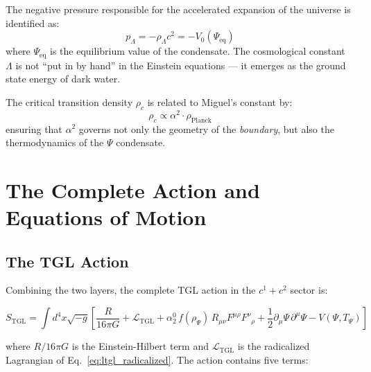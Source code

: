 \documentclass[12pt,a4paper,twoside]{article}
\newcommand{\alphaii}{\alpha^{2}}
\newcommand{\Ltgl}{\mathcal{L}_{\text{TGL}}}
\newcommand{\Psifield}{\Psi}
\newcommand{\boundary}{\textit{boundary}}
\begin{document}
The negative pressure responsible for the accelerated expansion of the universe is identified as:
\begin{equation}
p_\Lambda = -\rho_\Lambda c^2 = -V_0(\Psifield_{\text{eq}})
\label{eq:dark_pressure}
\end{equation}
where $\Psifield_{\text{eq}}$ is the equilibrium value of the condensate. The cosmological constant $\Lambda$ is not ``put in by hand'' in the Einstein equations --- it emerges as the ground state energy of dark water.

The critical transition density $\rho_c$ is related to Miguel's constant by:
\begin{equation}
\rho_c \propto \alphaii \cdot \rho_{\text{Planck}}
\label{eq:critical_density}
\end{equation}
ensuring that $\alphaii$ governs not only the geometry of the \boundary, but also the thermodynamics of the $\Psifield$ condensate.


\section{The Complete Action and Equations of Motion}


\subsection{The TGL Action}

Combining the two layers, the complete TGL action in the $c^1 + c^2$ sector is:

\begin{equationbox}[title={Complete TGL Action}]
\begin{equation}
\boxed{S_{\text{TGL}} = \int d^4x \sqrt{-g} \left[\frac{R}{16\pi G} + \Ltgl + \alpha_2^{0}\, f(\rho_\Psifield)\, R_{\mu\nu}F^{\mu\rho}F^{\nu}{}_{\rho} + \frac{1}{2}\partial_\mu\Psifield\,\partial^\mu\Psifield - V(\Psifield, T_\Psifield)\right]}
\label{eq:full_action}
\end{equation}
\end{equationbox}

\noindent where $R/16\pi G$ is the Einstein-Hilbert term and $\Ltgl$ is the radicalized Lagrangian of Eq.~\eqref{eq:ltgl_radicalized}. The action contains five terms:
\end{document}
